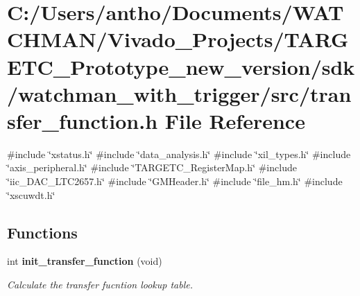 \section{C\+:/\+Users/antho/\+Documents/\+W\+A\+T\+C\+H\+M\+A\+N/\+Vivado\+\_\+\+Projects/\+T\+A\+R\+G\+E\+T\+C\+\_\+\+Prototype\+\_\+new\+\_\+version/sdk/watchman\+\_\+with\+\_\+trigger/src/transfer\+\_\+function.h File Reference}
\label{transfer__function_8h}
{\ttfamily \#include \char`\"{}xstatus.\+h\char`\"{}}\newline
{\ttfamily \#include \char`\"{}data\+\_\+analysis.\+h\char`\"{}}\newline
{\ttfamily \#include \char`\"{}xil\+\_\+types.\+h\char`\"{}}\newline
{\ttfamily \#include \char`\"{}axis\+\_\+peripheral.\+h\char`\"{}}\newline
{\ttfamily \#include \char`\"{}T\+A\+R\+G\+E\+T\+C\+\_\+\+Register\+Map.\+h\char`\"{}}\newline
{\ttfamily \#include \char`\"{}iic\+\_\+\+D\+A\+C\+\_\+\+L\+T\+C2657.\+h\char`\"{}}\newline
{\ttfamily \#include \char`\"{}G\+M\+Header.\+h\char`\"{}}\newline
{\ttfamily \#include \char`\"{}file\+\_\+hm.\+h\char`\"{}}\newline
{\ttfamily \#include \char`\"{}xscuwdt.\+h\char`\"{}}\newline
\subsection*{Functions}
\begin{DoxyCompactItemize}
\item 
int \textbf{ init\+\_\+transfer\+\_\+function} (void)
\begin{DoxyCompactList}\small\item\em Calculate the transfer fucntion lookup table. \end{DoxyCompactList}\end{DoxyCompactItemize}


